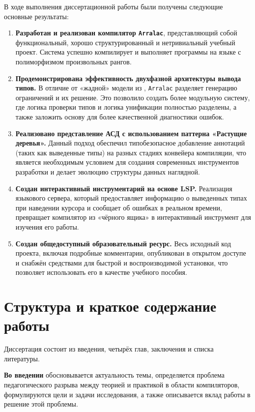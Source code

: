 В ходе выполнения диссертационной работы были получены следующие основные результаты:
\begin{enumerate}
    \item \textbf{Разработан и реализован компилятор \texttt{Arralac}}, представляющий собой функциональный, хорошо структурированный и нетривиальный учебный проект. Система успешно компилирует и выполняет программы на языке с полиморфизмом произвольных рангов.
    \item \textbf{Продемонстрирована эффективность двухфазной архитектуры вывода типов.} В отличие от «жадной» модели из \cite{jones-practical-2007}, \texttt{Arralac} разделяет генерацию ограничений и их решение. Это позволило создать более модульную систему, где логика проверки типов и логика унификации полностью разделены, а также заложить основу для более качественной диагностики ошибок.
    \item \textbf{Реализовано представление АСД с использованием паттерна «Растущие деревья».} Данный подход обеспечил типобезопасное добавление аннотаций (таких как выведенные типы) на разных стадиях конвейера компиляции, что является необходимым условием для создания современных инструментов разработки и делает эволюцию структуры данных наглядной.
    \item \textbf{Создан интерактивный инструментарий на основе LSP.} Реализация языкового сервера, который предоставляет информацию о выведенных типах при наведении курсора и сообщает об ошибках в реальном времени, превращает компилятор из «чёрного ящика» в интерактивный инструмент для изучения его работы.
    \item \textbf{Создан общедоступный образовательный ресурс.} Весь исходный код проекта, включая подробные комментарии, опубликован в открытом доступе и снабжён средствами для быстрой и воспроизводимой установки, что позволяет использовать его в качестве учебного пособия.
\end{enumerate}

\chapter[Структура и краткое содержание работы]{Структура и краткое содержание \\ работы}

Диссертация состоит из введения, четырёх глав, заключения и списка литературы.

\textbf{Во введении} обосновывается актуальность темы, определяется проблема педагогического разрыва между теорией и практикой в области компиляторов, формулируются цели и задачи исследования, а также описывается вклад работы в решение этой проблемы.

